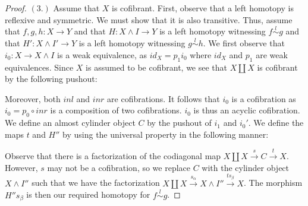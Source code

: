 \documentclass[../thesis.tex]{subfiles}
\begin{document}
\begin{proof}
                $(3.)$ Assume that $X$ is cofibrant. First, observe that a left homotopy is reflexive and symmetric. We must show that it is also transitive. Thus, assume that $f,g,h:X\rightarrow Y$ and that $H:X\wedge I\rightarrow Y$ is a left homotopy witnessing $f \overset{l}{\sim} g$ and that $H':X\wedge I'\rightarrow Y$ is a left homotopy witnessing $g\overset{l}{\sim} h$. We first observe that $i_0: X\rightarrow X\wedge I$ is a weak equivalence, as $id_X = p_1i_0$ where $id_X$ and $p_1$ are weak equivalences. Since $X$ is assumed to be cofibrant, we see that $X\coprod X$ is cofibrant by the following pushout:
                \begin{center}
                \end{center}
                Moreover, both $inl$ and $inr$ are cofibrations. It follows that $i_0$ is a cofibration as $i_0 = p_0\circ inr$ is a composition of two cofibrations. $i_0$ is thus an acyclic cofibration. We define an almost cylinder object $C$ by the pushout of $i_1$ and $i_0'$. We define the maps $t$ and $H''$ by using the universal property in the following manner:
                \begin{center}
                    \qquad
                \end{center}
                Observe that there is a factorization of the codiagonal map $X\coprod X \overset{s}{\rightarrow} C \overset{t}{\rightarrow} X$. However, $s$ may not be a cofibration, so we replace $C$ with the cylinder object $X\wedge I''$ such that we have the factorization $X\coprod X \overset{s_\alpha}{\rightarrow} X\wedge I'' \overset{ts_\beta}{\rightarrow} X$. The morphism $H''s_\beta$ is then our required homotopy for $f\overset{l}{\sim}g$.


\end{proof}
\end{document}
